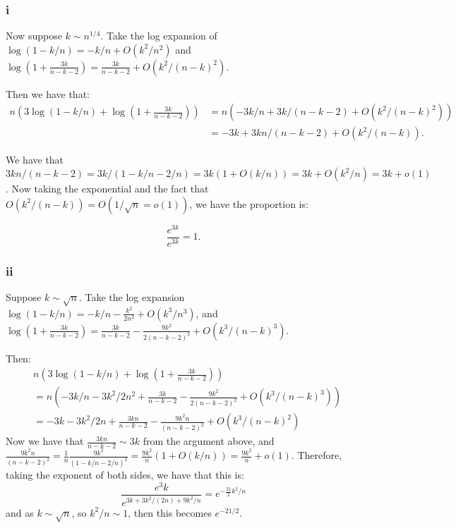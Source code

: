 \documentclass[]{article}
\theoremstyle{definition}
\numberwithin{theorem}{section}
\numberwithin{equation}{section}
\begin{document}
\subsubsection{i}
Now suppose $k \sim n^{1/4}$.
Take the log expansion of
$\log(1 - k/n) = -k/n + O(k^2/n^2)$ and $\log\left(1 + \frac{3k}{n - k - 2}\right) = \frac{3k}{n - k - 2} + O(k^2/(n- k)^2)$. 

Then we have that:
\begin{align*}
	n \left( 3 \log(1 - k/n) + \log\left(1 + \frac{3k}{n - k - 2}\right)\right) &= n \left(- 3k/n + 3k/(n - k - 2) + O(k^2/(n - k)^2)\right) \\
	&= -3k + 3kn/(n - k - 2) + O(k^2/(n - k)).
\end{align*}

We have that $3kn/(n - k - 2) = 3k/(1 - k/n - 2/n) = 3k(1 + O(k/n)) = 3k + O(k^2/n) =  3k + o(1)$. 
Now taking the exponential and the fact that $O(k^2/(n - k)) = O(1/\sqrt{n} = o(1))$, we have the proportion is:

\begin{equation}
	\frac{e^{3k}}{e^{3k}} = 1. 
\end{equation}

\subsubsection{ii}
Suppose $k \sim \sqrt{n}$. 
Take the log expansion 
$\log(1 - k/n)  = -k/n - \frac{k^2}{2n^2} + O(k^3/n^3)$, and $\log\left(1 + \frac{3k}{n - k - 2}\right) = \frac{3k}{n - k - 2} - \frac{9k^2}{2(n - k - 2)^2} + O(k^3/(n - k)^3)$. 

Then:
\begin{align*}
	&n \left( 3 \log(1 - k/n) + \log\left(1 + \frac{3k}{n - k - 2}\right)\right) \\
	&= n \left(-3k/n - 3k^2/2n^2 + \frac{3k}{n - k - 2} - \frac{9k^2}{2(n - k - 2)^2} + O(k^3/(n - k)^3)\right)\\
	&= -3k - 3k^2/2n + \frac{3kn}{n - k - 2} - \frac{9k^2 n}{(n - k - 2)^2} + O(k^3/(n - k)^2)
\end{align*}
Now we have that $\frac{3kn}{n - k - 2}  \sim 3k$ from the argument above, and $\frac{9k^2 n}{(n - k - 2)^2} = \frac{1}{n} \frac{9 k^2}{(1 - k/n - 2/n)^2} = \frac{9k^2}{n}(1 + O(k/n)) = \frac{9k^2}{n} + o(1)$. Therefore, taking the exponent of both sides, we have that this is:
\begin{equation}
	\frac{e^3k }{e^{3k + 3k^2/(2n) + 9k^2/n}} = e^{-\frac{21}{2} k^2/n}
\end{equation}
and as $k \sim \sqrt{n}$, so $k^2/n \sim 1$, then this becomes $e^{-21/2}$. 
\end{document}
